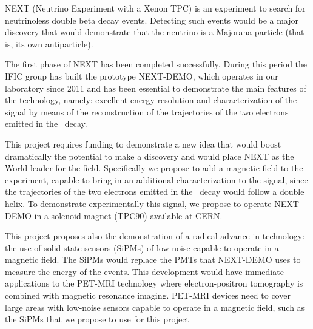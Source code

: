 NEXT (Neutrino Experiment with a Xenon TPC) is an experiment to search for neutrinoless double beta decay events. Detecting such events would be a major discovery that would demonstrate that the neutrino is a Majorana particle (that is, its own antiparticle). 

The first phase of NEXT has been completed successfully. During this period the IFIC group has built the prototype NEXT-DEMO, which operates in our laboratory since 2011 and has been essential to demonstrate the main features of the technology, namely: excellent energy resolution and characterization of the signal by means of the reconstruction of the trajectories of the two electrons emitted in the \bbonu\ decay.

This project requires funding to demonstrate a new idea that would boost dramatically the potential to make a discovery and would place NEXT as the World leader for the field. Specifically we propose to add a magnetic field to the experiment, capable to bring in an additional characterization to the signal, since the trajectories of the two electrons emitted in the \bbonu\ decay would follow a double helix. To demonstrate experimentally this signal, we propose to operate NEXT-DEMO in a solenoid magnet (TPC90) available at CERN.

This project proposes also the demonstration of a radical advance in technology: the use of solid state sensors (SiPMs) of low noise capable to operate in a magnetic field. The SiPMs would replace the PMTs that NEXT-DEMO uses to measure the energy of the events. This development would have immediate applications to the PET-MRI technology where electron-positron tomography is combined with magnetic resonance imaging. PET-MRI devices need to cover large areas with low-noise sensors capable to operate in a magnetic field, such as the SiPMs that we propose to use for this project
